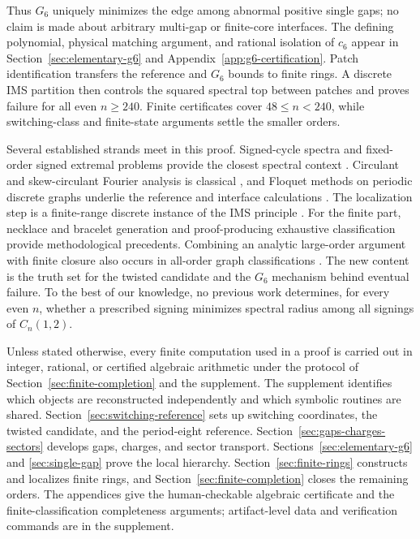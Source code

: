 Thus \(G_6\) uniquely minimizes the edge among abnormal positive single
gaps; no claim is made about arbitrary multi-gap or finite-core interfaces.
The defining polynomial, physical matching argument, and rational isolation
of \(c_6\) appear in Section~\ref{sec:elementary-g6} and
Appendix~\ref{app:g6-certification}. Patch identification transfers the
reference and \(G_6\) bounds to finite rings. A discrete IMS partition then
controls the squared spectral top between patches and proves failure for all
even \(n\geq240\). Finite certificates cover \(48\leq n<240\), while
switching-class and finite-state arguments settle the smaller orders.

Several established strands meet in this proof. Signed-cycle spectra and
fixed-order signed extremal problems provide the closest spectral context
\cite{AkbariBelardoDodongehNematollahi2018,
BelardoBrunettiCiampella2021,BrunettiStanic2022}. Circulant and
skew-circulant Fourier analysis is classical
\cite{Davis1979,KarnerSchneidUeberhuber2003}, and Floquet methods on periodic
discrete graphs underlie the reference and interface calculations
\cite{Kuchment1993,KorotyaevSaburova2017,KorotyaevSaburova2023,
KuchmentVainberg2006}. The localization step is a finite-range discrete
instance of the IMS principle \cite{CyconFroeseKirschSimon1987}. For the
finite part, necklace and bracelet generation
\cite{FredricksenMaiorana1978,Sawada2001} and proof-producing exhaustive
classification \cite{Lam1991,GoedgebeurSchaudt2018,Goedgebeur2020} provide
methodological precedents. Combining an analytic large-order argument with
finite closure also occurs in all-order graph classifications
\cite{LinNing2021,GoedgebeurRendersWienerZamfirescu2024}. The new content is
the truth set for the
twisted candidate and the \(G_6\) mechanism behind eventual failure. To the
best of our knowledge, no previous work determines, for every even \(n\),
whether a prescribed signing minimizes spectral radius among all signings of
\(C_n(1,2)\).

Unless stated otherwise, every finite computation used in a proof is carried
out in integer, rational, or certified algebraic arithmetic under the
protocol of Section~\ref{sec:finite-completion} and the supplement. The
supplement identifies which objects are reconstructed independently and
which symbolic routines are shared. Section~\ref{sec:switching-reference}
sets up switching coordinates, the twisted candidate, and the period-eight
reference. Section~\ref{sec:gaps-charges-sectors} develops gaps, charges,
and sector transport. Sections~\ref{sec:elementary-g6} and
\ref{sec:single-gap} prove the local hierarchy. Section~\ref{sec:finite-rings}
constructs and localizes finite rings, and
Section~\ref{sec:finite-completion} closes the remaining orders. The
appendices give the human-checkable algebraic certificate and the
finite-classification completeness arguments; artifact-level data and
verification commands are in the supplement.

